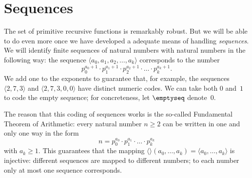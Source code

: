 \documentclass[10pt,a4paper]{article}
\theoremstyle{plain}
\theoremstyle{definition}
\theoremstyle{remark}
\newcommand*{\olfileid}[3]{}
\newcommand*{\olsection}[1]{\section*{#1}}
\newcommand*{\olimport}[1]{}
\providecommand{\tuple}[1]{\langle #1 \rangle}
\begin{document}
\olimport{introduction}

\olimport{primitive-recursion}

\olimport{composition}

\olimport{pr-functions}

\olimport{notation-pr-functions}

\olimport{pr-functions-computable}

\olimport{examples}

\olimport{pr-relations}

\olimport{bounded-minimization}

\olimport{primes}

\olimport{sequences}

\olimport{trees}

\olimport{other-recursions}

\olimport{non-pr-functions}

\olimport{partial-functions}

\olimport{normal-form}

\olimport{halting-problem}

\olimport{general-recursive-functions}

\OLEndChapterHook





\olfileid{cmp}{rec}{seq}
\olsection{Sequences}

The set of primitive recursive functions is remarkably robust. But we
will be able to do even more once we have developed a adequate means
of handling \emph{sequences}. We will identify finite sequences of
natural numbers with natural numbers in the following way: the
sequence $\langle a_0, a_1, a_2, \dots, a_k \rangle$ corresponds to
the number
\[
p_0^{a_0+1} \cdot p_1^{a_1+1} \cdot p_2^{a_2+1} \cdot \dots \cdot
p_k^{a_k+1}.
\]
We add one to the exponents to guarantee that, for example, the
sequences $\langle 2, 7, 3\rangle$ and $\langle 2, 7, 3, 0, 0 \rangle$
have distinct numeric codes. We can take both $0$ and~$1$ to code the
empty sequence; for concreteness, let $\emptyseq$ denote~$0$.

The reason that this coding of sequences works is the so-called
Fundamental Theorem of Arithmetic: every natural number $n \ge 2$ can
be written in one and only one way in the form
\[
n = p_0^{a_0} \cdot p_1^{a_1} \cdot \dots \cdot p_k^{a_k}
\]
with $a_k \ge 1$. This guarantees that the mapping $\tuple{}(a_0,
\dots, a_k) = \tuple{a_0, \dots, a_k}$ is injective: different
sequences are mapped to different numbers; to each number only at most
one sequence corresponds.
\end{document}
